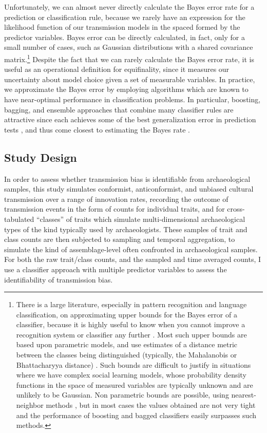 Unfortunately, we can almost never directly calculate the Bayes error
rate for a prediction or classification rule, because we rarely have an
expression for the likelihood function of our transmission models in the
spaced formed by the predictor variables. Bayes error can be directly calculated, in fact, only for
a small number of cases, such as Gaussian distributions with a shared
covariance
matrix.\footnote{There is a large literature, especially in pattern recognition and language classification, on approximating upper bounds for the Bayes error of a classifier, because it is highly useful to know when you cannot improve a recognition system or classifier any further \cite{Antos:1999dn, Dobbin:2009du, McLachlan:1975eo}.  Most such upper bounds are based upon parametric models, and use estimates of a distance metric between the classes being distinguished (typically, the Mahalanobis or Bhattacharyya distance) \cite{devijver1982pattern}.  Such bounds are difficult to justify in situations where we have complex social learning models, whose probability density functions in the space of measured variables are typically unknown and are unlikely to be Gaussian.  Non parametric bounds are possible, using nearest-neighbor methods \cite{Loizou:1987bi}, but in most cases the values obtained are not very tight and the performance of boosting and bagged classifiers easily surpasses such methods.}
Despite the fact that we can rarely calculate the Bayes error rate, it
is useful as an operational definition for equifinality, since it
measures our uncertainty about model choice given a set of measurable
variables. In practice, we approximate the Bayes error by employing
algorithms which are known to have near-optimal performance in
classification problems. In particular, boosting, bagging, and ensemble
approaches that combine many classifier rules are attractive since each
achieves some of the best generalization error in prediction tests
\cite{hastie2009elements}, and thus come closest to estimating the
Bayes rate \cite{tumer2003bayes}.  


\subsection{Study Design}\label{model-comparisons}

In order to assess whether transmission bias is identifiable from archaeological samples, this study simulates conformist, anticonformist, and unbiased cultural transmission over a range of innovation rates, recording the outcome of transmission events in the form of counts for individual traits, and for cross-tabulated ``classes'' of traits which simulate multi-dimensional archaeological types of the kind typically used by archaeologists.  These samples of trait and class counts are then subjected to sampling and temporal aggregation, to simulate the kind of assemblage-level often confronted in archaeological samples.  For both the raw trait/class counts, and the sampled and time averaged counts, I use a classifier approach with multiple predictor variables to assess the identifiability of transmission bias.    

